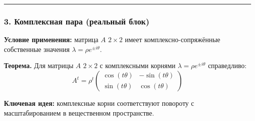\bigskip
\hrule
\bigskip

\subsubsection*{3. Комплексная пара (реальный блок)}

\textbf{Условие применения:} матрица $A$ $2 \times 2$ имеет комплексно-сопряжённые собственные значения $\lambda = \rho e^{\pm i\theta}$.

\textbf{Теорема.} Для матрицы $A$ $2 \times 2$ с комплексными корнями $\lambda = \rho e^{\pm i\theta}$ справедливо:
\[
A^t = \rho^t \begin{pmatrix} \cos(t\theta) & -\sin(t\theta) \\ \sin(t\theta) & \cos(t\theta) \end{pmatrix}
\]

\textbf{Ключевая идея:} комплексные корни соответствуют повороту с масштабированием в вещественном пространстве.

\begin{center}
\end{center}

